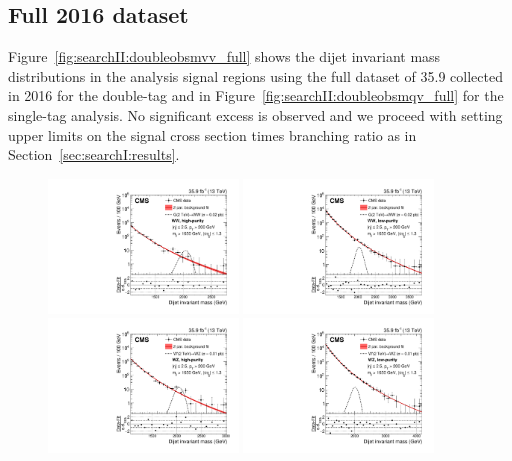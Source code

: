\subsection{Full 2016 dataset}   
\label{sec:searchII:brg17001res}
Figure~\ref{fig:searchII:doubleobsmvv_full} shows the dijet invariant mass distributions in the analysis signal regions using the full dataset of 35.9 \fbinv collected in 2016 for the double-tag and in Figure~\ref{fig:searchII:doubleobsmqv_full} for the single-tag analysis. No significant excess is observed and we proceed with setting upper limits on the signal cross section times branching ratio as in Section~\ref{sec:searchI:results}.\newline
\begin{figure}[h!]
\centering
\includegraphics[width=0.45\textwidth]{figures/analysis/search2/B2G-17-001/Figure_004-a.pdf}
\includegraphics[width=0.45\textwidth]{figures/analysis/search2/B2G-17-001/Figure_004-b.pdf}\\
\includegraphics[width=0.45\textwidth]{figures/analysis/search2/B2G-17-001/Figure_004-c.pdf}
\includegraphics[width=0.45\textwidth]{figures/analysis/search2/B2G-17-001/Figure_004-d.pdf}\\

\end{figure}
